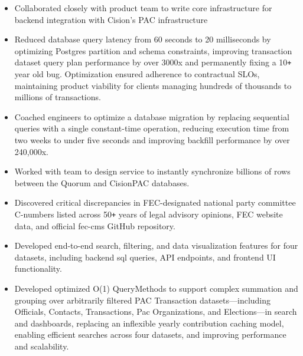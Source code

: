 \documentclass[]{article}
\def\Plus{\texttt{+}}
\begin{document}
\begin{itemize}
	\item Collaborated closely with product team to write core infrastructure for backend integration with Cision's PAC infrastructure
    \item Reduced database query latency from 60 seconds to 20 milliseconds by optimizing Postgres partition and schema constraints, improving transaction dataset query plan performance by over 3000x and permanently fixing a 10{\Plus} year old bug. Optimization ensured adherence to contractual SLOs, maintaining product viability for clients managing hundreds of thousands to millions of transactions.
    \item Coached engineers to optimize a database migration by replacing sequential queries with a single constant-time operation, reducing execution time from two weeks to under five seconds and improving backfill performance by over 240,000x.
    \item Worked with team to design service to instantly synchronize billions of rows between the Quorum and CisionPAC databases.
    \item Discovered critical discrepancies in FEC-designated national party committee C-numbers listed across 50{\Plus} years of legal advisory opinions, FEC website data, and official fec-cms GitHub repository.
    \item Developed end-to-end search, filtering, and data visualization features for four datasets, including backend sql queries, API endpoints, and frontend UI functionality.
    \item Developed optimized O(1) QueryMethods to support complex summation and grouping over arbitrarily filtered PAC Transaction datasets—including Officials, Contacts, Transactions, Pac Organizations, and Elections—in search and dashboards, replacing an inflexible yearly contribution caching model, enabling efficient searches across four datasets, and improving performance and scalability.\\
\end{itemize}
\end{document}
